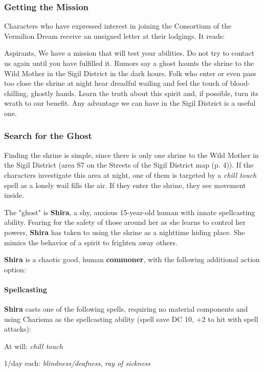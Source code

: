 \documentclass[a4paper, 11pt, bg=full, twocolumn, nooutline]{dndbook}
\begin{document}
\subsubsection{Getting the Mission}

Characters who have expressed interest in joining the Consortium of the Vermilion Dream receive an unsigned letter at their lodgings. It reads:

\begin{DndReadAloud}
Aspirants,
We have a mission that will test your abilities. Do not try to contact us again until you have fulfilled it.
Rumors say a ghost haunts the shrine to the Wild Mother in the Sigil District in the dark hours. Folk who enter or even pass too close the shrine at night hear dreadful wailing and feel the touch of blood-chilling, ghostly hands.
Learn the truth about this spirit and, if possible, turn its wrath to our benefit. Any advantage we can have in the Sigil District is a useful one.
\end{DndReadAloud}

\subsubsection{Search for the Ghost}

Finding the shrine is simple, since there is only one shrine to the Wild Mother in the Sigil District (area S7 on the Streets of the Sigil District map (p. 4)). If the characters investigate this area at night, one of them is targeted by a \textit{chill touch} spell as a lonely wail fills the air. If they enter the shrine, they see movement inside.

The "ghost" is \textbf{Shira}, a shy, anxious 15-year-old human with innate spellcasting ability. Fearing for the safety of those around her as she learns to control her powers, \textbf{Shira} has taken to using the shrine as a nighttime hiding place. She mimics the behavior of a spirit to frighten away others.

\textbf{Shira} is a chaotic good, human \textbf{commoner}, with the following additional action option:

\begin{DndSidebar}{}
\paragraph{Spellcasting}

\textbf{Shira} casts one of the following spells, requiring no material components and using Charisma as the spellcasting ability (spell save DC 10, +2 to hit with spell attacks):

At will: \textit{chill touch}

1/day each: \textit{blindness/deafness}, \textit{ray of sickness}
\end{DndSidebar}
\end{document}
